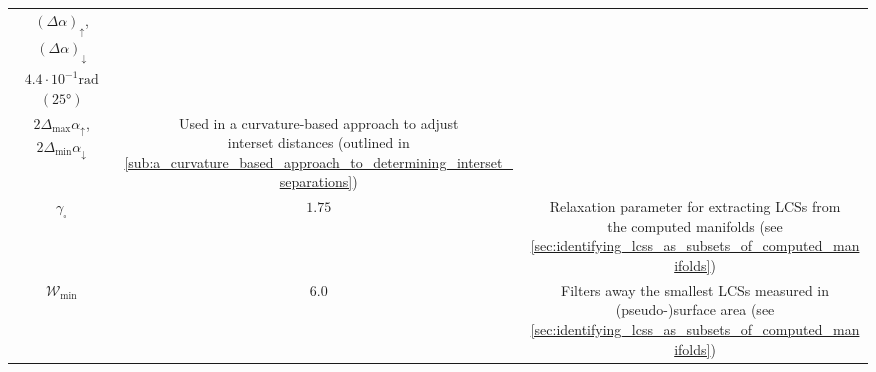 \begin{table}[htpb]
\begin{tabular}{ccc}
{        ${(\Delta\alpha)}_{\uparrow}$, ${(\Delta\alpha)}_{\downarrow}$} &
        \makecell[c]{$8.7\cdot10^{-2}\si{\radian}$ \phantom{2}$(5\si{\degree})$\\ %
            $4.4\cdot10^{-1}\si{\radian}$ $(25\si{\degree})$\\[1.5pt]%
        $2\Delta_{\max}\alpha_{\uparrow}$, $2\Delta_{\min}\alpha_{\downarrow}$}%
        & \makecell[c]{Used in a curvature-based approach to adjust\\
        interset distances (outlined in
        \cref{sub:a_curvature_based_approach_to_determining_interset_separations})}
        \\[18pt]
        $\gamma_{\square}$ &
        $1.75$ &
        \makecell[c]{Relaxation parameter for extracting LCSs from\\ the
            computed manifolds (see
        \cref{sec:identifying_lcss_as_subsets_of_computed_manifolds})}
        \\[9pt]
        $\mathcal{W}_{\text{min}}$ &
        $6.0$ &
        \makecell[c]{Filters away the smallest LCSs measured in\\
        (pseudo-)surface area (see
        \cref{sec:identifying_lcss_as_subsets_of_computed_manifolds})}
        \\
        \bottomrule
    \end{tabular}
\end{table}

